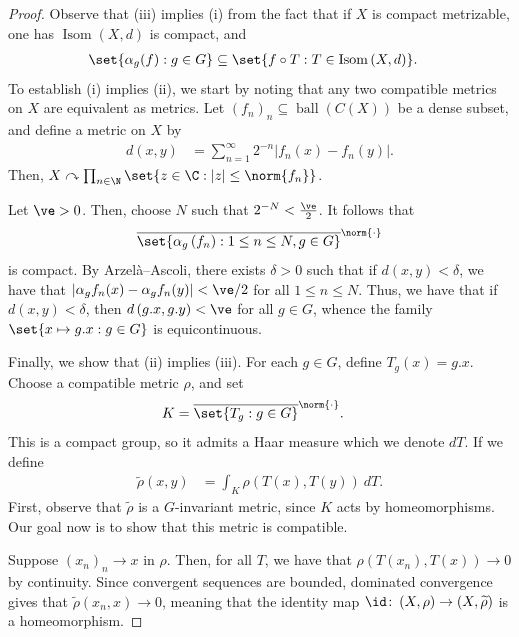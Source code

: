 \documentclass[10pt]{mypackage}
\begin{document}
\begin{proof}
  Observe that (iii) implies (i) from the fact that if $X$ is compact metrizable, one has $\operatorname{Isom}\left( X,d \right)$ is compact, and
  \begin{align*}
    \set{\alpha_g(f) : g\in G} &\subseteq \set{f\circ T : T\in \operatorname{Isom}\left( X,d \right)}.
  \end{align*}
  To establish (i) implies (ii), we start by noting that any two compatible metrics on $X$ are equivalent as metrics. Let $\left( f_n \right)_{n}\subseteq \operatorname{ball}\left( C(X) \right)$ be a dense subset, and define a metric on $X$ by
  \begin{align*}
    d\left( x,y \right) &= \sum_{n=1}^{\infty} 2^{-n}\left\vert f_n(x)-f_n(y) \right\vert.
  \end{align*}
  Then, $X\curvearrowright \prod_{n\in \N}\set{z\in \C : \left\vert z \right\vert\leq \norm{f_n}}$.

  Let $\ve > 0$. Then, choose $N$ such that $2^{-N} < \frac{\ve}{2}$. It follows that
  \begin{align*}
    \overline{\set{\alpha_g\left( f_n \right) : 1\leq n \leq N,g\in G}}^{\norm{\cdot}}
  \end{align*}
  is compact. By Arzelà--Ascoli, there exists $\delta > 0$ such that if $d\left( x,y \right) < \delta$, we have that $\left\vert \alpha_gf_n(x) - \alpha_gf_n(y)\right\vert < \ve/2$ for all $1\leq n \leq N$. Thus, we have that if $d\left( x,y \right) < \delta$, then $d\left( g.x,g.y \right) < \ve$ for all $g\in G$, whence the family $\set{x\mapsto g.x : g\in G}$ is equicontinuous.

  Finally, we show that (ii) implies (iii). For each $g\in G$, define $T_g(x) = g.x$. Choose a compatible metric $\rho$, and set
  \begin{align*}
    K &= \overline{\set{T_g : g\in G}}^{\norm{\cdot}}.
  \end{align*}
  This is a compact group, so it admits a Haar measure which we denote $dT$. If we define
  \begin{align*}
    \widetilde{\rho}\left( x,y \right) &= \int_{K}^{} \rho\left( T(x),T(y) \right)\:dT.
  \end{align*}
  First, observe that $ \widetilde{\rho} $ is a $G$-invariant metric, since $K$ acts by homeomorphisms. Our goal now is to show that this metric is compatible.

  Suppose $\left( x_n \right)_n\to x$ in $\rho$. Then, for all $T$, we have that $\rho\left( T\left( x_n \right),T(x) \right)\to 0$ by continuity. Since convergent sequences are bounded, dominated convergence gives that $ \widetilde{\rho}\left( x_n,x \right)\to 0 $, meaning that the identity map $\id\colon \left( X,\rho \right)\to \left( X,\widetilde{\rho} \right)$ is a homeomorphism.
\end{proof}
\end{document}
